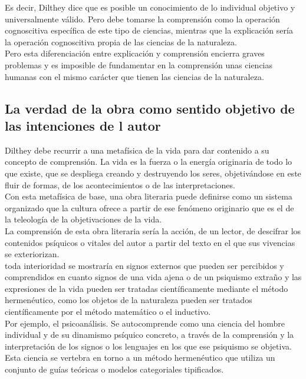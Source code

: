 \documentclass[a4paper, 11pt, twocolumn, spanish]{article}
\begin{document}
Es decir, Dilthey dice que es posible un conocimiento de lo individual
objetivo y universalmente válido. Pero debe tomarse la comprensión
como la operación cognoscitiva específica de este tipo de ciencias,
mientras que la explicación sería la operación cognoscitiva propia de
las ciencias de la naturaleza.\\[0pt]
Pero esta diferenciación entre explicación y comprensión encierra
graves problemas y es imposible de fundamentar en la comprensión unas
ciencias humanas con el mismo carácter que tienen las ciencias de la
naturaleza.

\subsection{La verdad de la obra como sentido objetivo de las intenciones de l autor}
\label{sec:orgf15888d}
Dilthey debe recurrir a una metafísica de la vida para dar contenido a
su concepto de comprensión. La vida es la fuerza o la energía
originaria de todo lo que existe, que se despliega creando y
destruyendo los seres, objetivándose en este fluir de formas, de los
acontecimientos o de las interpretaciones.\\[0pt]
Con esta metafísica de base, una obra literaria puede definirse como
un sistema organizado que la cultura ofrece a partir de ese fenómeno
originario que es el de la teleología de la objetivaciones de la
vida.\\[0pt]
La comprensión de esta obra literaria sería la acción, de un lector,
de descifrar los contenidos psíquicos o vitales del autor a partir del
texto en el que sus vivencias se exteriorizan.\\[0pt]

toda interioridad se mostraría en signos externos que pueden ser
percibidos y comprendidos en cuanto signos de una vida ajena o de un
psiquismo extraño y las expresiones de la vida pueden ser tratadas
científicamente mediante el método hermenéutico, como los objetos de
la naturaleza pueden ser tratados científicamente por el método
matemático o el inductivo.\\[0pt]

Por ejemplo, el psicoanálisis. Se autocomprende como una ciencia del
hombre individual y de su dinamismo psíquico concreto, a través de la
comprensión y la interpretación de los signos o los lenguajes en los
que ese psiquismo se objetiva. Esta ciencia se vertebra en torno a un
método hermenéutico que utiliza un conjunto de guías teóricas o
modelos categoriales tipificados.
\end{document}
